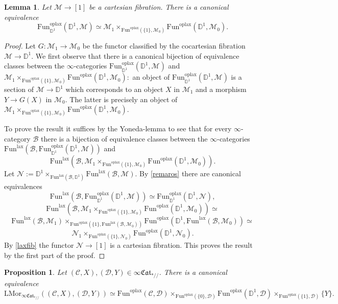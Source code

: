 \documentclass[10pt,oneside]{article}
\numberwithin{equation}{section} %
\numberwithin{figure}{section} %
\theoremstyle{plain}
\newtheorem{lemma}[theorem]{Lemma}
\newtheorem{proposition}[theorem]{Proposition}
\theoremstyle{definition}
\newcommand{\bD}{{\mathbb D}}
\newcommand{\mB}{{\mathcal B}}
\newcommand{\mC}{{\mathcal C}}
\newcommand{\mD}{{\mathcal D}}
\newcommand{\mM}{{\mathcal M}}
\newcommand{\mN}{{\mathcal N}}
\renewcommand{\L}{{\mathrm L}}
\newcommand{\Fun}{\mathrm{Fun}}
\newcommand{\lax}{{\mathrm{lax}}}
\newcommand{\oplax}{{\mathrm{oplax}}}
\newcommand{\Mor}{{\mathrm{Mor}}}
\newcommand{\fcat}{\mathfrak{Cat}}
\begin{document}
\begin{lemma}\label{sectio}
Let $\mM \to [1]$ be a cartesian fibration.
There is a canonical equivalence
$$\Fun^\oplax_{\bD^1}(\bD^1, \mM) \simeq \mM_1 \times_{\Fun^\oplax(\{1 \},\mM_0)} \Fun^\oplax(\bD^1,\mM_0).$$

\end{lemma}

\begin{proof}

Let $G: \mM_1 \to \mM_0$ be the functor classified by the cocartesian fibration $\mM \to \bD^1.$
We first observe that there is a canonical bijection of equivalence classes between the $\infty$-categories 
$\Fun^\oplax_{\bD^1}(\bD^1, \mM) $ and $\mM_1 \times_{\Fun^\oplax(\{1 \},\mM_0)} \Fun^\oplax(\bD^1,\mM_0):$
an object of $\Fun^\oplax_{\bD^1}(\bD^1, \mM)$
is a section of $\mM \to \bD^1$ which corresponds to an object $X$ in $\mM_1$ and a morphism $Y \to G(X) $ in $\mM_0.$
The latter is precisely an object of $\mM_1 \times_{\Fun^\oplax(\{1 \},\mM_0)} \Fun^\oplax(\bD^1,\mM_0).$

To prove the result it suffices by the Yoneda-lemma to see that for every $\infty$-category $\mB$ there is a bijection of equivalence classes between the $\infty$-categories 
$ \Fun^\lax(\mB, \Fun^\oplax_{\bD^1}(\bD^1, \mM)) $ and $$\Fun^\lax(\mB, \mM_1 \times_{\Fun^\oplax(\{1 \},\mM_0)} \Fun^\oplax(\bD^1,\mM_0)).$$
Let $\mN:= \bD^1 \times_{\Fun^\lax(\mB, \bD^1)} \Fun^\lax(\mB, \mM) $. By \cref{remaros} there are canonical equivalences
$$ \Fun^\lax(\mB, \Fun^\oplax_{\bD^1}(\bD^1, \mM)) \simeq \Fun_{\bD^1}^\oplax(\bD^1, \mN),$$
$$ \Fun^\lax(\mB, \mM_1 \times_{\Fun^\oplax(\{1 \},\mM_0)} \Fun^\oplax(\bD^1,\mM_0)) \simeq $$$$ \Fun^\lax(\mB, \mM_1) \times_{\Fun^\oplax(\{1 \},\Fun^\lax(\mB,\mM_0))} \Fun^\oplax(\bD^1,\Fun^\lax(\mB,\mM_0)) \simeq $$$$ \mN_1 \times_{\Fun^\oplax(\{1 \}, \mN_0)} \Fun^\oplax(\bD^1,\mN_0).$$
By \cref{laxfib} the functor $\mN \to [1]$ is a cartesian fibration.
This proves the result by the first part of the proof.
\end{proof}

\begin{proposition}\label{homuniv}
Let $(\mC,X), (\mD,Y) \in \infty\fcat_{*//}$.
There is a canonical equivalence
$$ \L\Mor_{\infty\fcat_{*//}}((\mC,X), (\mD,Y)) \simeq \Fun^\oplax(\mC,\mD) \times_{\Fun^\oplax(\{0\},\mD)} \Fun^\oplax(\bD^1,\mD) \times_{\Fun^\oplax(\{1\},\mD)} \{Y\}.$$
\end{proposition}
\end{document}
